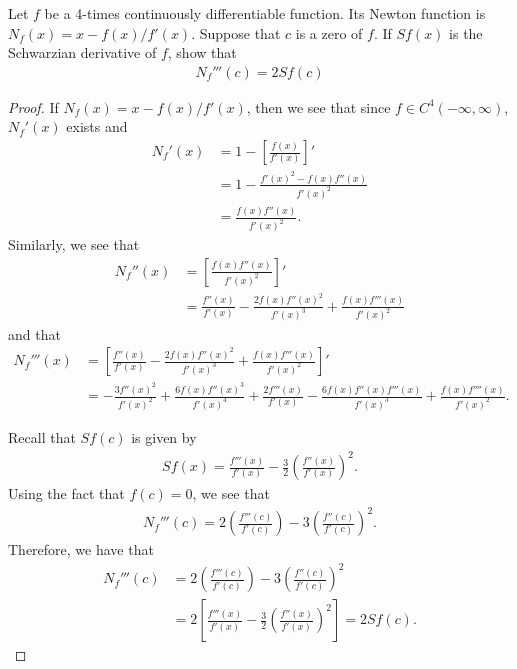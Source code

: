 \begin{problem}{4}
  Let $f$ be a 4-times continuously differentiable function. Its Newton
  function is $N_f(x) = x - f(x)/f'(x)$. Suppose that $c$ is a zero of $f$.
  If $Sf(x)$ is the Schwarzian derivative of $f$, show that
  \begin{align*}
    N_f'''(c) = 2Sf(c)
  \end{align*}
\end{problem}

\begin{proof}
  If $N_f(x) = x - f(x)/f'(x)$, then we see that since $f\in C^4(-\infty, \infty)$,
  $N_f'(x)$ exists and
  \begin{align*}
    N_f'(x) &= 1 - \left[\frac{f(x)}{f'(x)}\right]' \\
    &= 1 - \frac{f'(x)^2-f(x)f''(x)}{f'(x)^2} \\
    &= \frac{f(x)f''(x)}{f'(x)^2}.
  \end{align*}
  Similarly, we see that
  \begin{align*}
    N_f''(x) &= \left[\frac{f(x)f''(x)}{f'(x)^2}\right]' \\
    &= \frac{f''(x)}{f'(x)} - \frac{2f(x)f''(x)^2}{f'(x)^3} + \frac{f(x)f'''(x)}{f'(x)^2}
  \end{align*}
  and that
  \begin{align*}
    N_f'''(x) &= \left[\frac{f''(x)}{f'(x)} - \frac{2f(x)f''(x)^2}{f'(x)^3} + \frac{f(x)f'''(x)}{f'(x)^2}\right]'\\
    &= - \frac{3f''(x)^2}{f'(x)^2} + \frac{6f(x)f''(x)^3}{f'(x)^4} + \frac{2f'''(x)}{f'(x)} - \frac{6f(x)f''(x)f'''(x)}{f'(x)^3}+\frac{f(x)f''''(x)}{f'(x)^2}.
  \end{align*}

  Recall that $Sf(c)$ is given by
  \begin{align*}
    S f(x) = \frac{f'''(x)}{f'(x)} - \frac{3}{2}\left(\frac{f''(x)}{f'(x)}\right)^2.
  \end{align*}
  Using the fact that $f(c) = 0$, we see that
  \begin{align*}
    N_f'''(c) = 2 \left(\frac{f'''(c)}{f'(c)}\right)-3\left(\frac{f''(c)}{f'(c)}\right)^2.
  \end{align*}
  Therefore, we have that
  \begin{align*}
    N_f'''(c) &= 2 \left(\frac{f'''(c)}{f'(c)}\right)-3\left(\frac{f''(c)}{f'(c)}\right)^2\\
    &= 2 \left[\frac{f'''(x)}{f'(x)} - \frac{3}{2}\left(\frac{f''(x)}{f'(x)}\right)^2\right] = 2 Sf(c).
  \end{align*}
\end{proof}
\newpage
